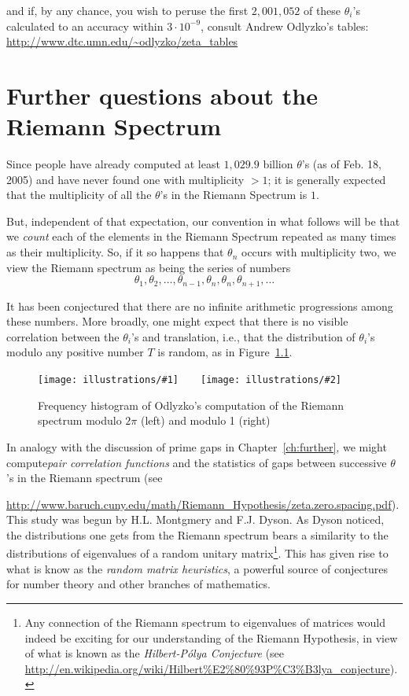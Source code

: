 \documentclass[openany]{book}
\newcommand{\illtwo}[4]{%
   \begin{figure}[H]\centering%
   \texttt{[image: illustrations/\#1]}$\qquad$\texttt{[image: illustrations/\#2]}%
   \caption{#4}%
    \end{figure}}
\theoremstyle{plain}
\theoremstyle{definition}
\begin{document}
{{\noindent{}and if, by any chance, you wish to peruse the first
$2{,}001{,}052$
 of these $\theta_i$'s calculated to an accuracy
within $3\cdot 10^{-9}$, consult Andrew Odlyzko's tables:
\url{http://www.dtc.umn.edu/~odlyzko/zeta_tables}



\chapter{ Further questions about the Riemann Spectrum}

Since people have already computed at least $1{,}029.9 $
billion $\theta$'s (as of Feb. 18, 2005) and have never found one with
multiplicity $>1$; it is generally expected that the multiplicity of all
the $\theta$'s in the Riemann Spectrum is $1$.

  But, independent of
that expectation, our convention in what follows will be that we {\it
  count} each of the elements in the Riemann Spectrum repeated as many
times as their multiplicity. So, if it so happens that $\theta_n$
occurs with multiplicity two, we view the Riemann spectrum as being
the series of numbers
  $$\theta_1, \theta_2, \dots, \theta_{n-1}, \theta_n, \theta_n, \theta_{n+1}, \dots$$

It has been conjectured that there are no infinite arithmetic progressions among these numbers.  More broadly, one might expect that there is no visible  correlation between the $\theta_i$'s and translation, i.e., that the distribution of $\theta_i$'s modulo any positive number $T$ is random, as in Figure~\ref{fig:zero-spacing}.



\illtwo{zero-spacing-mod2pi}{zero-spacing-mod1}{0.4}{Frequency histogram of Odlyzko's computation of the Riemann spectrum modulo $2\pi$ (left) and modulo 1 (right)\label{fig:zero-spacing}}

        In analogy with the discussion of prime gaps in Chapter~\ref{ch:further}, we might compute{\it pair correlation functions} and the statistics of gaps between successive $\theta$'s in the Riemann spectrum (see {\url{http://www.baruch.cuny.edu/math/Riemann_Hypothesis/zeta.zero.spacing.pdf}). This study was  begun by H.L. Montgmery and F.J. Dyson. As  Dyson noticed, the distributions one gets from the Riemann spectrum bears a similarity to the distributions of eigenvalues of a random unitary matrix{\footnote{ Any connection of the Riemann spectrum to eigenvalues of matrices would indeed be exciting for our understanding of the Riemann Hypothesis, in view of what is known as the {\it Hilbert-P{\'o}lya Conjecture}  (see {\url{http://en.wikipedia.org/wiki/Hilbert\%E2\%80\%93P\%C3\%B3lya_conjecture}}).}}. This has given rise to what is know as the {\it random matrix heuristics},  a powerful source of conjectures for number theory and other branches of mathematics.

}}}
\end{document}
